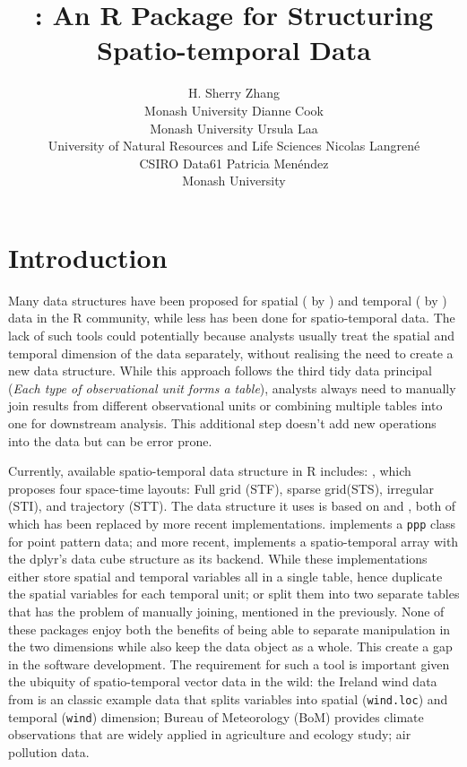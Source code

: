 \documentclass[
]{jss}
\author{
H. Sherry Zhang\\Monash University \And Dianne Cook\\Monash University
\AND Ursula Laa\\University of Natural Resources and Life Sciences
\AND Nicolas Langrené\\CSIRO Data61 \AND Patricia
Menéndez\\Monash University \AND
}
\title{\pkg{cubble}: An R Package for Structuring Spatio-temporal Data}
\begin{document}
\newpage

\hypertarget{introduction}{%
\section{Introduction}\label{introduction}}

Many data structures have been proposed for spatial ( by
\citet{sf}) and temporal ( by \citet{tsibble}) data in the
R community, while less has been done for spatio-temporal data. The lack
of such tools could potentially because analysts usually treat the
spatial and temporal dimension of the data separately, without realising
the need to create a new data structure. While this approach follows the
third tidy data principal \citep{tidydata} (\emph{Each type of
observational unit forms a table}), analysts always need to manually
join results from different observational units or combining multiple
tables into one for downstream analysis. This additional step doesn't
add new operations into the data but can be error prone. \newline

Currently, available spatio-temporal data structure in R includes:
 \citep{spacetime}, which proposes four space-time
layouts: Full grid (STF), sparse grid(STS), irregular (STI), and
trajectory (STT). The data structure it uses is based on 
\citep{sp} and  \citep{xts}, both of which has been replaced by
more recent implementations.  \citep{spatstat} implements
a \texttt{ppp} class for point pattern data; and more recent,
 \citep{stars} implements a spatio-temporal array with the
dplyr's data cube structure  \citep{cubelyr} as its
backend. While these implementations either store spatial and temporal
variables all in a single table, hence duplicate the spatial variables
for each temporal unit; or split them into two separate tables that has
the problem of manually joining, mentioned in the previously. None of
these packages enjoy both the benefits of being able to separate
manipulation in the two dimensions while also keep the data object as a
whole. This create a gap in the software development. The requirement
for such a tool is important given the ubiquity of spatio-temporal
vector data in the wild: the Ireland wind data from  is an
classic example data that splits variables into spatial
(\texttt{wind.loc}) and temporal (\texttt{wind}) dimension; Bureau of
Meteorology (BoM) provides climate observations that are widely applied
in agriculture and ecology study; air pollution data. \newline
\end{document}
